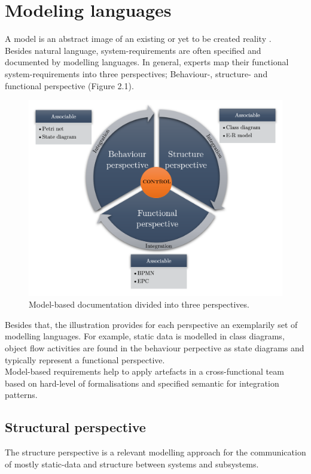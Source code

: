 \newpage
\chapter{Modeling languages}

A model is an abstract image of an existing or yet to be created reality \cite{Stachowiak.1973}.
\\
Besides natural language, system-requirements are often specified and documented by modelling languages. In general, experts map their functional system-requirements into three perspectives; Behaviour-, structure- and functional perspective (Figure 2.1).\\


\begin{figure}[!hb]
	\centering
	\includegraphics[scale=0.7]{PerspektivenModel}
	\caption{Model-based documentation divided into three perspectives.}
\end{figure}


Besides that, the illustration provides for each perspective an exemplarily set of modelling languages. For example, static data is modelled in class diagrams, object flow activities are found in the behaviour perpective as state diagrams and typically represent a functional perspective. \cite{Pohl.2015} \\
Model-based requirements help to apply artefacts in a cross-functional team based on hard-level of formalisations and specified semantic for integration patterns. \\[3em]


\newpage
\section{Structural perspective}
The structure perspective is a relevant modelling approach for the communication of mostly static-data and structure between systems and subsystems.


